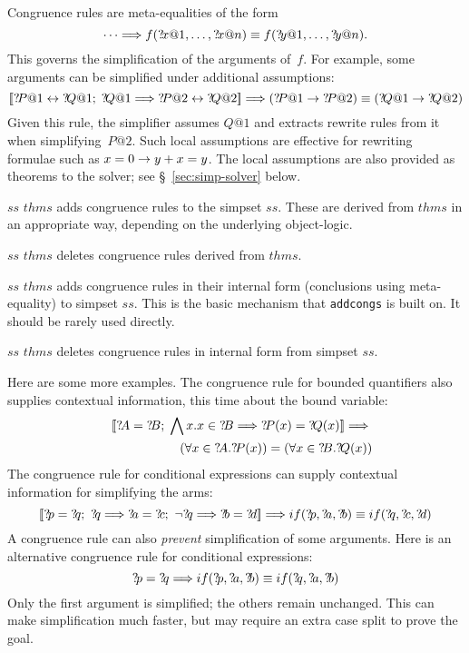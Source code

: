 Congruence rules are meta-equalities of the form
\[ \dots \Longrightarrow
   f({?\!x@1},\ldots,{?\!x@n}) \equiv f({?\!y@1},\ldots,{?\!y@n}).
\]
This governs the simplification of the arguments of~$f$.  For
example, some arguments can be simplified under additional assumptions:
\[ \List{\Var{P@1} \bimp \Var{Q@1};\; \Var{Q@1} \Imp \Var{P@2} \bimp \Var{Q@2}}
   \Imp (\Var{P@1} \imp \Var{P@2}) \equiv (\Var{Q@1} \imp \Var{Q@2})
\]
Given this rule, the simplifier assumes $Q@1$ and extracts rewrite
rules from it when simplifying~$P@2$.  Such local assumptions are
effective for rewriting formulae such as $x=0\rightarrow y+x=y$.  The local
assumptions are also provided as theorems to the solver; see
\S~\ref{sec:simp-solver} below.

\begin{ttdescription}
  
\item[$ss$ \ttindexbold{addcongs} $thms$] adds congruence rules to the
  simpset $ss$.  These are derived from $thms$ in an appropriate way,
  depending on the underlying object-logic.
  
\item[$ss$ \ttindexbold{delcongs} $thms$] deletes congruence rules
  derived from $thms$.
  
\item[$ss$ \ttindexbold{addeqcongs} $thms$] adds congruence rules in
  their internal form (conclusions using meta-equality) to simpset
  $ss$.  This is the basic mechanism that \texttt{addcongs} is built
  on.  It should be rarely used directly.
  
\item[$ss$ \ttindexbold{deleqcongs} $thms$] deletes congruence rules
  in internal form from simpset $ss$.
  
\end{ttdescription}

\medskip

Here are some more examples.  The congruence rule for bounded
quantifiers also supplies contextual information, this time about the
bound variable:
\begin{eqnarray*}
  &&\List{\Var{A}=\Var{B};\; 
          \Forall x. x\in \Var{B} \Imp \Var{P}(x) = \Var{Q}(x)} \Imp{} \\
 &&\qquad\qquad
    (\forall x\in \Var{A}.\Var{P}(x)) = (\forall x\in \Var{B}.\Var{Q}(x))
\end{eqnarray*}
The congruence rule for conditional expressions can supply contextual
information for simplifying the arms:
\[ \List{\Var{p}=\Var{q};~ \Var{q} \Imp \Var{a}=\Var{c};~
         \neg\Var{q} \Imp \Var{b}=\Var{d}} \Imp
   if(\Var{p},\Var{a},\Var{b}) \equiv if(\Var{q},\Var{c},\Var{d})
\]
A congruence rule can also {\em prevent\/} simplification of some arguments.
Here is an alternative congruence rule for conditional expressions:
\[ \Var{p}=\Var{q} \Imp
   if(\Var{p},\Var{a},\Var{b}) \equiv if(\Var{q},\Var{a},\Var{b})
\]
Only the first argument is simplified; the others remain unchanged.
This can make simplification much faster, but may require an extra case split
to prove the goal.  



